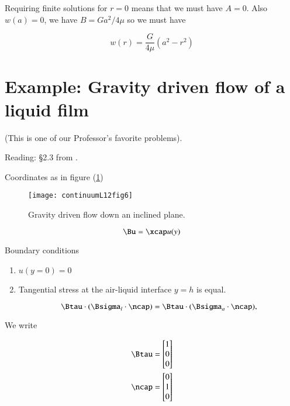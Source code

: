 Requiring finite solutions for $r = 0$ means that we must have $A = 0$.  Also $w(a) = 0$, we have $B = G a^2/4 \mu$ so we must have

\begin{equation}\label{eqn:continuumL12:130}
w(r) = \frac{G}{4 \mu}( a^2 - r^2 )
\end{equation}

\section{Example: Gravity driven flow of a liquid film}

(This is one of our Professor's favorite problems).

Reading: \S 2.3 from \cite{acheson1990elementary}.

Coordinates as in figure (\ref{fig:continuumL12:continuumL12fig6})
\begin{figure}[htp]
   \centering
   \texttt{[image: continuumL12fig6]}
   \caption{Gravity driven flow down an inclined plane.}\label{fig:continuumL12:continuumL12fig6}
\end{figure}

\begin{equation}\label{eqn:continuumL12:150}
\Bu = \xcap u(y)
\end{equation}

Boundary conditions

\begin{enumerate}
\item $u(y = 0) = 0$
\item Tangential stress at the air-liquid interface $y = h$ is equal.

\begin{equation}\label{eqn:continuumL12:170}
\Btau \cdot (\Bsigma_l \cdot \ncap) = \Btau \cdot (\Bsigma_a \cdot \ncap),
\end{equation}
\end{enumerate}

We write

\begin{align}\label{eqn:continuumL12:190}
\Btau &=
\begin{bmatrix}
1 \\
0 \\
0
\end{bmatrix} \\
\ncap &=
\begin{bmatrix}
0 \\
1 \\
0
\end{bmatrix}
\end{align}

